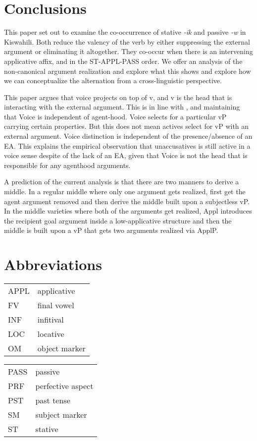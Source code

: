 \documentclass[output=paper]{langscibook}
\begin{document}
\section{Conclusions}
This paper set out to examine the co-occurrence of stative \textit{-ik} and passive \textit{-w} in Kiswahili. Both reduce the valency of the verb by either suppressing the external argument or eliminating it altogether. They co-occur when there is an intervening applicative affix, and in the ST-APPL-PASS order. We offer an analysis of the non-canonical argument realization and explore what this shows and explore how we can conceptualize the alternation from a cross-linguistic perspective. 

This paper argues that voice projects on top of v, and v is the head that is interacting with the external argument. This is in line with \citet{Collins:2005aa}, and \citet{johnson04} maintaining that Voice is independent of agent-hood. Voice selects for a particular vP carrying certain properties. But this does not mean actives select for vP with an external argument. Voice distinction is independent of the presence/absence of an EA. This explains the empirical observation that unaccusatives is still active in a voice sense despite of the lack of an EA, given that Voice is not the head that is responsible for any agenthood arguments.

 A prediction of the current analysis is that there are two manners to derive a middle. In a regular middle where only one argument gets realized, first get the agent argument removed and then derive the middle built upon a subjectless vP. In the middle varieties where both of the arguments get realized, Appl introduces the recipient goal argument inside a low-applicative structure and then the middle is built upon a vP that gets two arguments realized via ApplP.

\section*{Abbreviations}
\begin{tabularx}{.5\textwidth}{@{}lQ}
APPL & applicative\\
FV & final vowel\\
INF & infitival\\
LOC & locative \\
OM & object marker\\
\end{tabularx}\begin{tabularx}{.5\textwidth}{lQ@{}}
PASS & passive\\
PRF & perfective aspect\\
PST & past tense\\
SM & subject marker\\
ST & stative\\
\end{tabularx}
\end{document}
